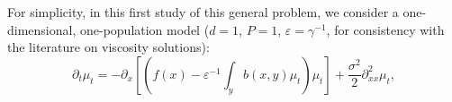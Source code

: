 \documentclass[onefignum,onetabnum]{siamart190516}
\newcommand{\1}{\mathbbm{1}}
\newcommand{\eps}{\varepsilon}
\begin{document}
For simplicity, in this first study of this general problem, we consider a one-dimensional, one-population model ($d=1$, $P=1$, $\eps=\gamma^{-1}$, for consistency with the literature on viscosity solutions):
\begin{equation}\label{eq:pdeSummary}
\partial_t\mu_t = -\partial_x\left[\left(f(x)- \eps^{-1}\int_{y} b(x,y)\mu_t \right)\mu_t\right]+\frac{\sigma^2}{2}\partial^2_{xx}\mu_t, 
\end{equation}
\end{document}
